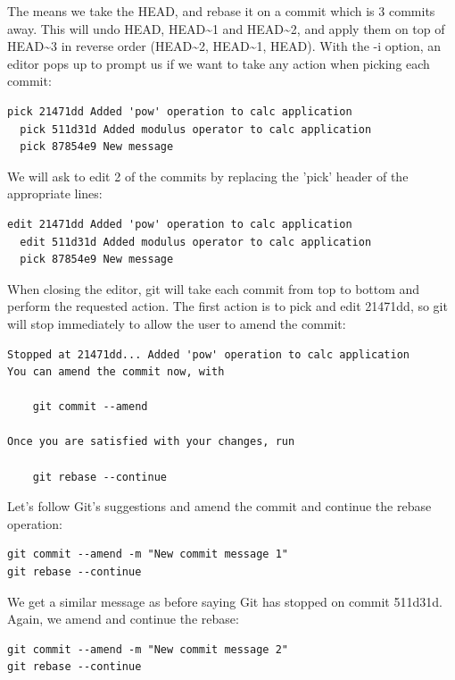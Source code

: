 \documentclass{../common/tufte-latex/tufte-handout}
\begin{document}
The means we take the HEAD, and rebase it on a commit which is 3 commits away.
This will undo HEAD, HEAD\textasciitilde1 and HEAD\textasciitilde2, and apply them on top of HEAD\textasciitilde3 in reverse order (HEAD\textasciitilde2, HEAD\textasciitilde1, HEAD).
With the -i option, an editor pops up to prompt us if we want to take any action when picking each commit:

\begin{lstlisting}[style=BashInputStyle]
  pick 21471dd Added 'pow' operation to calc application
  pick 511d31d Added modulus operator to calc application
  pick 87854e9 New message
\end{lstlisting}

We will ask to edit 2 of the commits by replacing the 'pick' header of the appropriate lines:

\begin{lstlisting}[style=BashInputStyle]
  edit 21471dd Added 'pow' operation to calc application
  edit 511d31d Added modulus operator to calc application
  pick 87854e9 New message
\end{lstlisting}

When closing the editor, git will take each commit from top to bottom and perform the requested action.
The first action is to pick and edit 21471dd, so git will stop immediately to allow the user to amend the commit:

\begin{lstlisting}[style=BashInputStyle]
Stopped at 21471dd... Added 'pow' operation to calc application
You can amend the commit now, with

	git commit --amend

Once you are satisfied with your changes, run

	git rebase --continue
\end{lstlisting}

Let's follow Git's suggestions and amend the commit and continue the rebase operation:

\begin{lstlisting}[style=BashInputStyle]
git commit --amend -m "New commit message 1"
git rebase --continue
\end{lstlisting}

We get a similar message as before saying Git has stopped on commit 511d31d.
Again, we amend and continue the rebase:

\begin{lstlisting}[style=BashInputStyle]
git commit --amend -m "New commit message 2"
git rebase --continue
\end{lstlisting}
\end{document}
